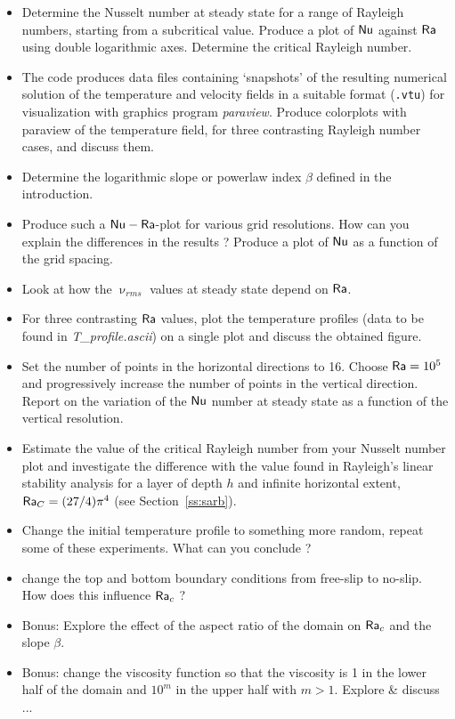 \begin{itemize}
\item Determine the Nusselt number at steady state for a range of Rayleigh numbers, 
starting from a subcritical value. 
Produce a plot of ${\mathsf{Nu}}$ against ${\mathsf{Ra}}$ using double logarithmic axes. 
Determine the critical Rayleigh number. 

\item The code produces data files containing `snapshots' of the resulting numerical solution 
of the temperature and velocity fields in a suitable format ({\tt .vtu}) for visualization with 
graphics program {\sl paraview}. 
Produce colorplots with paraview of the temperature field, for three contrasting Rayleigh number cases, 
and discuss them.

\item Determine the logarithmic slope or powerlaw index $\beta$ defined in the introduction.

\item Produce such a ${\mathsf{Nu}}-{\mathsf{Ra}}$-plot for various grid resolutions. How can you explain the differences in 
the results ? Produce a plot of ${\mathsf{Nu}}$ as a function of the grid spacing. 

\item Look at how the $\upnu_{rms}$ values at steady state depend on ${\mathsf{Ra}}$. 

\item For three contrasting ${\mathsf{Ra}}$ values, plot the temperature profiles 
(data to be found in {\sl T\_profile.ascii}) on a single plot and discuss the obtained figure.

\item Set the number of points in the horizontal directions to 16. Choose ${\mathsf{Ra}}=10^5$ 
and progressively increase the number 
of points in the vertical direction. Report on the variation of the ${\mathsf{Nu}}$ number at steady 
state as a function of the vertical resolution.

\item Estimate the value of the critical Rayleigh number from your Nusselt number plot and 
investigate the difference with the value found in Rayleigh's linear stability analysis 
for a layer of depth $h$ and infinite horizontal extent, ${\mathsf{Ra}}_C = (27/4)  \pi^4$ 
(see Section~\ref{ss:sarb}).

\item Change the initial temperature profile to something more random, repeat some of these experiments. 
What can you conclude ?

\item change the top and bottom boundary conditions from free-slip to no-slip. How 
does this influence ${\mathsf{Ra}}_c$ ?

\item Bonus: Explore the effect of the aspect ratio of the domain on ${\mathsf{Ra}}_c$ and the slope $\beta$.

\item Bonus: change the viscosity function so that the viscosity is 1 in the lower half of the domain 
and $10^m$ in the upper half with $m>1$. Explore \& discuss ...

\end{itemize}


